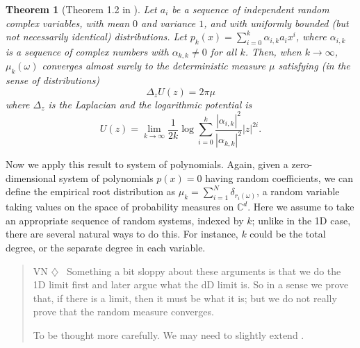 \documentclass[12pt]{article}
\def\C{\mathbb{C}}
\newenvironment{vn}{\begin{quote}\color{myviolet} \small\sf VN $\diamondsuit$~}{\end{quote}}
\newtheorem{theorem}{Theorem}[section]
\begin{document}
\begin{theorem}[Theorem 1.2 in \cite{BN}]\label{thm:logpot}
    Let $a_i$ be a sequence of independent random complex variables, with mean $0$ and variance $1$, and with uniformly bounded (but not necessarily identical) distributions. Let $p_k(x)=\sum_{i=0}^k \alpha_{i,k} a_i x^i$, where $\alpha_{i,k}$ is a sequence of complex numbers with $\alpha_{k,k} \neq 0$ for all $k$. Then, when $k \longrightarrow \infty$, $\mu_k(\omega)$ converges almost surely to the deterministic measure $\mu$ satisfying (in the sense of distributions)
    \[  \Delta_z U(z) = 2 \pi \mu   \]
    where $\Delta_z$ is the Laplacian and the logarithmic potential is
    \begin{equation}\label{eq:logpot}
        U(z) = \lim_{k \rightarrow \infty} \frac{1}{2k} \log \sum_{i=0}^k \frac{|\alpha_{i,k}|^2}{|\alpha_{k,k}|^2} |z|^{2i}.  
    \end{equation}  
\end{theorem}

Now we apply this result to system of polynomials. Again, given a zero-dimensional system of polynomials $p(x)=0$ having random coefficients, we can define the empirical root distribution as $\mu_k = \sum_{i=1}^N \delta_{r_i(\omega)}$, a random variable taking values on the space of probability measures on $\C^d$. Here we assume to take an appropriate sequence of random systems, indexed by $k$; unlike in the 1D case, there are several natural ways to do this. For instance, $k$ could be the total degree, or the separate degree in each variable. 

\begin{vn}
    Something a bit sloppy about these arguments is that we do the 1D limit first and later argue what the dD limit is. So in a sense we prove that, if there is a limit, then it must be what it is; but we do not really prove that the random measure converges.

To be thought more carefully. We may need to slightly extend \cite[Lemma B.1]{BN}.
\end{vn}
\end{document}
